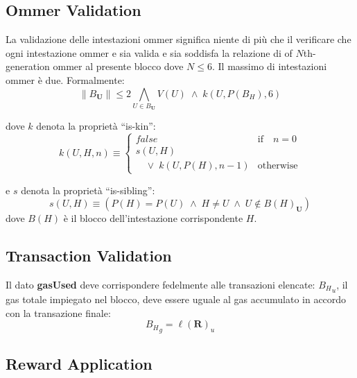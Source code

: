 \documentclass[9pt,oneside]{amsart}
\begin{document}
\begin{multicols}{2}
\subsection{Ommer Validation}

La validazione delle intestazioni ommer significa niente di più che il verificare che ogni intestazione ommer e sia valida e sia soddisfa la relazione di of $N$th-generation ommer al presente blocco dove $N \leq 6$. Il massimo di intestazioni ommer è due. Formalmente:
\begin{equation}
\lVert B_\mathbf{U} \rVert \leqslant 2 \bigwedge_{U \in B_\mathbf{U}} V(U) \; \wedge \; k(U, P(B_H), 6)
\end{equation}

dove  $k$ denota la proprietà ``is-kin'':
\begin{equation}
k(U, H, n) \equiv \begin{cases} false & \text{if} \quad n = 0 \\ 
s(U, H) &\\
\quad \vee \; k(U, P(H), n - 1) & \text{otherwise}
\end{cases}
\end{equation}

e  $s$ denota la proprietà ``is-sibling'':
\begin{equation}
s(U, H) \equiv (P(H) = P(U)\; \wedge \; H \neq U \; \wedge \; U \notin B(H)_\mathbf{U})
\end{equation}
dove  $B(H)$ è il blocco dell'intestazione corrispondente $H$.

\subsection{Transaction Validation}


Il dato \textbf{gasUsed} deve corrispondere fedelmente alle transazioni elencate: ${B_H}_u$, il gas totale impiegato nel blocco, deve essere uguale al gas accumulato in accordo con la transazione finale:
\begin{equation}
{B_H}_g = \ell(\mathbf{R})_u
\end{equation}

\subsection{Reward Application}


\end{multicols}
\end{document}
